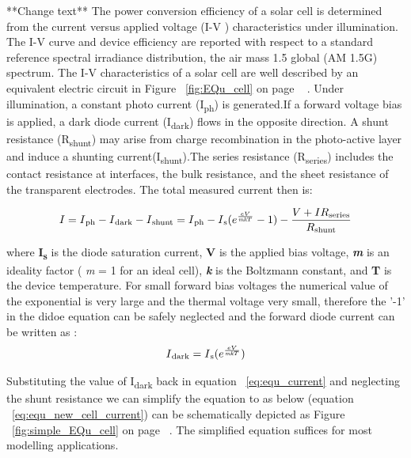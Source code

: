 **Change text**  
The power conversion efficiency of a solar cell is determined from the current versus applied voltage (I-V ) characteristics under illumination. The I-V curve and device efficiency are reported with respect to a standard reference spectral irradiance distribution, the air mass 1.5 global (AM 1.5G) spectrum\cite{wenger2010strategies}. The I-V characteristics of a solar cell are well described by an equivalent electric circuit in Figure ~\ref{fig:EQu_cell} on page ~\pageref{fig:EQu_cell} . Under illumination, a constant photo current (I\textsubscript{ph}) is generated.If a forward voltage bias is applied, a dark diode current (I\textsubscript{dark}) flows in the opposite direction. A shunt resistance (R\textsubscript{shunt}) may arise from charge recombination in the photo-active layer and induce a shunting current(I\textsubscript{shunt}).The series resistance (R\textsubscript{series}) includes the contact resistance at interfaces, the bulk resistance, and the sheet resistance of the transparent electrodes. The total measured current then is:
 
 \begin{equation}
 \begin{aligned}
  I = I\textsubscript{ph} - I\textsubscript{dark} - I\textsubscript{shunt} = I\textsubscript{ph} -  I\textsubscript{s} (e^{\frac{eV}{\textit{mk}T}}-1) - \dfrac{V+IR\textsubscript{series}}{R\textsubscript{shunt}}
   \label{eq:equ_current}
   \end{aligned}
   \end{equation}

 where \textbf{I\textsubscript{s}} is the diode saturation current, \textbf{V} is the applied bias voltage, \textbf{\textit{m}} is an ideality factor ( \textit{m} = 1 for an ideal cell), \textbf{\textit{k}} is the Boltzmann constant, and \textbf{T} is the device temperature\cite{pointwenger2010strategies}. For small forward bias voltages the numerical value of the exponential is very large and 
  the thermal voltage very small, therefore the '-1' in the didoe equation can be safely neglected and the forward diode current can be written as :
  \begin{equation}
   \begin{aligned}
    I\textsubscript{dark}= I\textsubscript{s} (e^{\frac{eV}{\textit{mk}T}}) 
    \label{eq:equ_current_dark}
    \end{aligned}
   \end{equation}
   
   Substituting the value of I\textsubscript{dark} back in equation ~\ref{eq:equ_current} and neglecting the shunt resistance we can simplify the equation to as below (equation ~\ref{eq:equ_new_cell_current}) can be schematically depicted as Figure ~\ref{fig:simple_EQu_cell} on page ~\pageref{fig:simple_EQu_cell}. The simplified equation suffices for most modelling applications.
   
